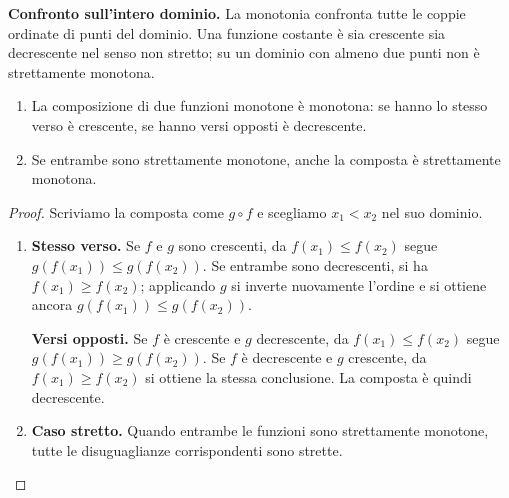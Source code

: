 \textbf{Confronto sull’intero dominio.} La monotonia confronta tutte le coppie ordinate di punti del dominio. Una funzione costante è sia crescente sia decrescente nel senso non stretto; su un dominio con almeno due punti non è strettamente monotona.

\begin{schema}
\end{schema}

\begin{proposizione}
\begin{enumerate}[label=\arabic*.]
\item La composizione di due funzioni monotone è monotona: se hanno lo stesso verso è crescente, se hanno versi opposti è decrescente.
\item Se entrambe sono strettamente monotone, anche la composta è strettamente monotona.
\end{enumerate}
\end{proposizione}
\begin{proof}
Scriviamo la composta come $g\circ f$ e scegliamo $x_1<x_2$ nel suo dominio.

\begin{enumerate}[label=\arabic*.]
\item \textbf{Stesso verso.} Se $f$ e $g$ sono crescenti, da $f(x_1)\le f(x_2)$ segue $g(f(x_1))\le g(f(x_2))$. Se entrambe sono decrescenti, si ha $f(x_1)\ge f(x_2)$; applicando $g$ si inverte nuovamente l'ordine e si ottiene ancora $g(f(x_1))\le g(f(x_2))$.

\textbf{Versi opposti.} Se $f$ è crescente e $g$ decrescente, da $f(x_1)\le f(x_2)$ segue $g(f(x_1))\ge g(f(x_2))$. Se $f$ è decrescente e $g$ crescente, da $f(x_1)\ge f(x_2)$ si ottiene la stessa conclusione. La composta è quindi decrescente.
\item \textbf{Caso stretto.} Quando entrambe le funzioni sono strettamente monotone, tutte le disuguaglianze corrispondenti sono strette.
\end{enumerate}
\end{proof}

